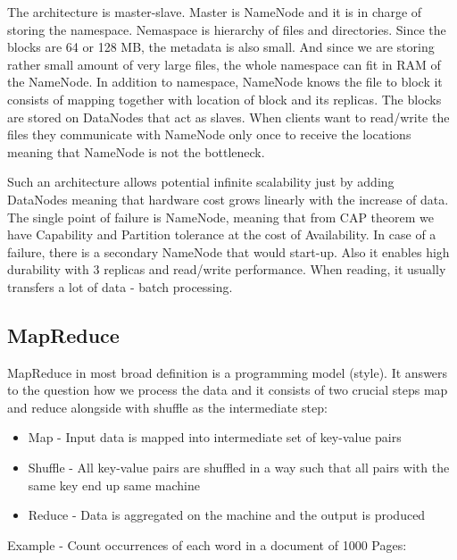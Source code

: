 The architecture is master-slave. Master is NameNode and it is in charge of storing the namespace. Nemaspace is hierarchy of files and directories. Since the blocks are 64 or 128 MB, the metadata is also small. And since we are storing rather small amount of very large files, the whole namespace can fit in RAM of the NameNode. In addition to namespace, NameNode knows the file to block it consists of mapping together with location of block and its replicas. The blocks are stored on DataNodes that act as slaves. When clients want to read/write the files they communicate with NameNode only once to receive the locations meaning that NameNode is not the bottleneck. 

Such an architecture allows potential infinite scalability just by adding DataNodes meaning that hardware cost grows linearly with the increase of data. The single point of failure is NameNode, meaning that from CAP theorem we have Capability and Partition tolerance at the cost of Availability. In case of a failure, there is a secondary NameNode that would start-up. Also it enables high durability with 3 replicas and read/write performance. When reading, it usually transfers a lot of data - batch processing.

\subsection{MapReduce}
MapReduce \cite{MapReduce} in most broad definition is a programming model (style). It answers to the question how we process the data and it consists of two crucial steps map and reduce alongside with shuffle as the intermediate step: 
\begin{itemize}
	\item Map - Input data is mapped into intermediate set of key-value pairs
	\item Shuffle - All key-value pairs are shuffled in a way such that all pairs with the same key end up same machine
	\item Reduce - Data is aggregated on the machine and the output is produced
\end{itemize}
Example - Count occurrences of each word in a document of 1000 Pages:

